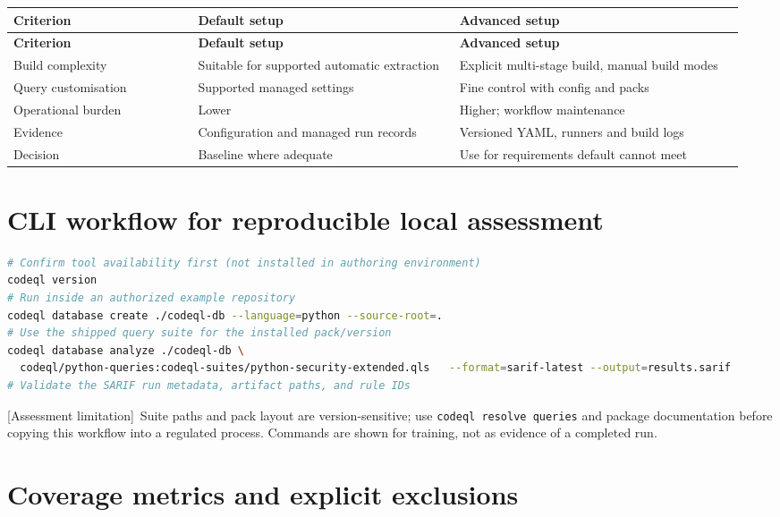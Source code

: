 \documentclass[11pt,letterpaper,oneside]{book}
\newcommand{\limt}{\textsf{[Assessment limitation]}}
\begin{document}
\small
\setlength{\tabcolsep}{2pt}
\renewcommand{\arraystretch}{1.18}
\begin{longtable}{>{\raggedright\arraybackslash}p{0.24\linewidth}>{\raggedright\arraybackslash}p{0.34\linewidth}>{\raggedright\arraybackslash}p{0.37\linewidth}}
\toprule
\textbf{Criterion} & \textbf{Default setup} & \textbf{Advanced setup}\\
\midrule
\endfirsthead
\toprule
\textbf{Criterion} & \textbf{Default setup} & \textbf{Advanced setup}\\
\midrule
\endhead
Build complexity & Suitable for supported automatic extraction & Explicit multi-stage build, manual build modes\\
Query customisation & Supported managed settings & Fine control with config and packs\\
Operational burden & Lower & Higher; workflow maintenance\\
Evidence & Configuration and managed run records & Versioned YAML, runners and build logs\\
Decision & Baseline where adequate & Use for requirements default cannot meet\\
\bottomrule
\end{longtable}
\normalsize

\section{CLI workflow for reproducible local assessment}

\begin{lstlisting}[caption={Illustrative CLI sequence; confirm suite syntax against installed bundle},language=bash]
# Confirm tool availability first (not installed in authoring environment)
codeql version
# Run inside an authorized example repository
codeql database create ./codeql-db --language=python --source-root=.
# Use the shipped query suite for the installed pack/version
codeql database analyze ./codeql-db \
  codeql/python-queries:codeql-suites/python-security-extended.qls   --format=sarif-latest --output=results.sarif
# Validate the SARIF run metadata, artifact paths, and rule IDs
\end{lstlisting}

\limt\ Suite paths and pack layout are version-sensitive; use \texttt{codeql resolve queries} and package documentation before copying this workflow into a regulated process. Commands are shown for training, not as evidence of a completed run.

\section{Coverage metrics and explicit exclusions}
\end{document}
